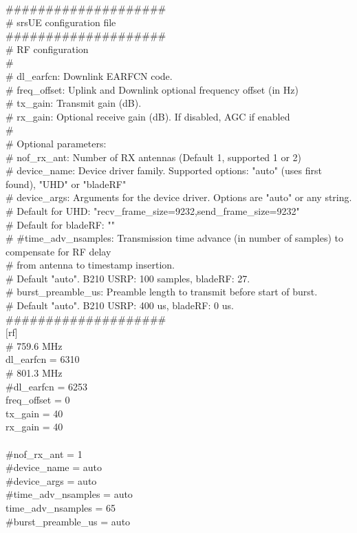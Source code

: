 \#\#\#\#\#\#\#\#\#\#\#\#\#\#\#\#\#\#\#\#  \\
\#                   srsUE configuration file  \\
\#\#\#\#\#\#\#\#\#\#\#\#\#\#\#\#\#\#\#\#  \\
\# RF configuration  \\
\#  \\
\# dl\_earfcn: Downlink EARFCN code.  \\
\# freq\_offset: Uplink and Downlink optional frequency offset (in Hz)  \\
\# tx\_gain: Transmit gain (dB).   \\
\# rx\_gain: Optional receive gain (dB). If disabled, AGC if enabled  \\
\#  \\
\# Optional parameters:   \\
\# nof\_rx\_ant:         Number of RX antennas (Default 1, supported 1 or 2)  \\
\# device\_name:        Device driver family. Supported options: "auto" (uses first found), "UHD" or "bladeRF" \\  
\# device\_args:        Arguments for the device driver. Options are "auto" or any string.   \\
\#                     Default for UHD: "recv\_frame\_size=9232,send\_frame\_size=9232"  \\
\#                     Default for bladeRF: ""  \\
\# \#time\_adv\_nsamples: Transmission time advance (in number of samples) to compensate for RF delay   \\
\#                     from antenna to timestamp insertion.   \\
\#                     Default "auto". B210 USRP: 100 samples, bladeRF: 27.  \\
\# burst\_preamble\_us:  Preamble length to transmit before start of burst.   \\
\#                     Default "auto". B210 USRP: 400 us, bladeRF: 0 us.   \\
\#\#\#\#\#\#\#\#\#\#\#\#\#\#\#\#\#\#\#\#  \\

$[$rf$]$  \\
\# 759.6 MHz  \\
dl\_earfcn = 6310  \\
\# 801.3 MHz  \\
\#dl\_earfcn = 6253  \\
freq\_offset = 0  \\
tx\_gain = 40  \\
rx\_gain = 40  \\
  \\
\#nof\_rx\_ant = 1  \\
\#device\_name = auto  \\
\#device\_args = auto  \\
\#time\_adv\_nsamples = auto  \\
time\_adv\_nsamples = 65  \\
\#burst\_preamble\_us = auto  \\
  
